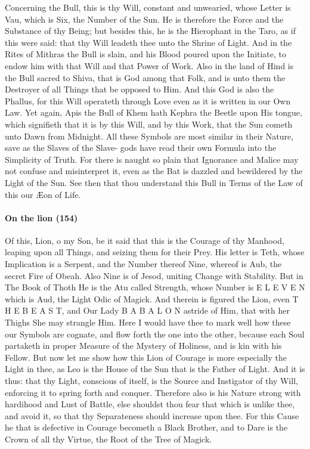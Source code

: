 Concerning the Bull, this is thy Will, constant and unwearied, whose Letter is Vau, which is Six, the Number of the Sun. He is therefore the Force and the Substance of thy Being; but besides this, he is the Hierophant in the Taro, as if this were said: that thy Will leadeth thee unto the Shrine of Light. And in the Rites of Mithras the Bull is slain, and his Blood poured upon the Initiate, to endow him with that Will and that Power of Work. Also in the land of Hind is the Bull sacred to Shiva, that is God among that Folk, and is unto them the Destroyer of all Things that be opposed to Him. And this God is also the Phallus, for this Will operateth through Love even as it is written in our Own Law. Yet again, Apis the Bull of Khem hath Kephra the Beetle upon His tongue, which signifieth that it is by this Will, and by this Work, that the Sun cometh unto Dawn from Midnight. All these Symbols are most similar in their Nature, save as the Slaves of the Slave- gods have read their own Formula into the Simplicity of Truth. For there is naught so plain that Ignorance and Malice may not confuse and misinterpret it, even as the Bat is dazzled and bewildered by the Light of the Sun. See then that thou understand this Bull in Terms of the Law of this our Æon of Life.

\paragraph{On the lion (154)}


Of this, Lion, o my Son, be it said that this is the Courage of thy Manhood, leaping upon all Things, and seizing them for their Prey. His letter is Teth, whose Implication is a Serpent, and the Number thereof Nine, whereof is Aub, the secret Fire of Obeah. Also Nine is of Jesod, uniting Change with Stability. But in The Book of Thoth He is the Atu called Strength, whose Number is E L E V E N which is Aud, the Light Odic of Magick. And therein is figured the Lion, even T H E B E A S T, and Our Lady B A B A L O N astride of Him, that with her Thighs She may strangle Him. Here I would have thee to mark well how these our Symbols are cognate, and flow forth the one into the other, because each Soul partaketh in proper Measure of the Mystery of Holiness, and is kin with his Fellow. But now let me show how this Lion of Courage is more especially the Light in thee, as Leo is the House of the Sun that is the Father of Light. And it is thus: that thy Light, conscious of itself, is the Source and Instigator of thy Will, enforcing it to spring forth and conquer. Therefore also is his Nature strong with hardihood and Lust of Battle, else shouldst thou fear that which is unlike thee, and avoid it, so that thy Separateness should increase upon thee. For this Cause he that is defective in Courage becometh a Black Brother, and to Dare is the Crown of all thy Virtue, the Root of the Tree of Magick.

